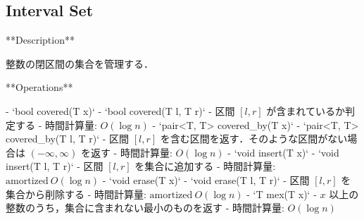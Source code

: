 \subsection{Interval Set}

\begin{small}
\begin{markdown}
**Description**

整数の閉区間の集合を管理する．

**Operations**

- `bool covered(T x)`
- `bool covered(T l, T r)`
    - 区間 $[l, r]$ が含まれているか判定する
    - 時間計算量: $O(\log n)$
- `pair<T, T> covered\_by(T x)`
- `pair<T, T> covered\_by(T l, T r)`
    - 区間 $[l, r]$ を含む区間を返す．そのような区間がない場合は $(-\infty, \infty)$ を返す
    - 時間計算量: $O(\log n)$
- `void insert(T x)`
- `void insert(T l, T r)`
    - 区間 $[l, r]$ を集合に追加する
    - 時間計算量: $\mathrm{amortized}\ O(\log n)$
- `void erase(T x)`
- `void erase(T l, T r)`
    - 区間 $[l, r]$ を集合から削除する
    - 時間計算量: $\mathrm{amortized}\ O(\log n)$
- `T mex(T x)`
    - $x$ 以上の整数のうち，集合に含まれない最小のものを返す
    - 時間計算量: $O(\log n)$
\end{markdown}
\end{small}

